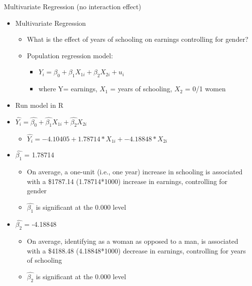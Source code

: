 \documentclass[8pt,ignorenonframetext,dvipsnames]{beamer}
\providecommand{\tightlist}{%
  \setlength{\itemsep}{0pt}\setlength{\parskip}{0pt}}
\let\olditem\item
\renewcommand{\item}{%
  \olditem\vspace{4pt}
}
\begin{document}
\begin{frame}{Multivariate Regression (no interaction effect)}
\protect\hypertarget{multivariate-regression-no-interaction-effect}{}

\begin{itemize}
\tightlist
\item
  Multivariate Regression

  \begin{itemize}
  \tightlist
  \item
    What is the effect of years of schooling on earnings controlling for
    gender?
  \item
    Population regression model:

    \begin{itemize}
    \tightlist
    \item
      \(Y_i = \beta_0 + \beta_1X_{1i} + \beta_2X_{2i} + u_i\)
    \item
      where Y= earnings, \(X_{1}\) = years of schooling, \(X_{2}\) = 0/1
      women
    \end{itemize}
  \end{itemize}
\item
  Run model in R
\item
  \(\hat{Y_i} = \hat{\beta_0} + \hat{\beta_1}X_{1i} + \hat{\beta_2}X_{2i}\)

  \begin{itemize}
  \tightlist
  \item
    \(\hat{Y_i} = -4.10405 + 1.78714*X_{1i} + -4.18848*X_{2i}\)
  \end{itemize}
\item
  \(\hat{\beta_1}\) = 1.78714

  \begin{itemize}
  \tightlist
  \item
    On average, a one-unit (i.e., one year) increase in schooling is
    associated with a \$1787.14 (1.78714*1000) increase in earnings,
    controlling for gender
  \item
    \(\hat{\beta_1}\) is significant at the 0.000 level
  \end{itemize}
\item
  \(\hat{\beta_2}\) = -4.18848

  \begin{itemize}
  \tightlist
  \item
    On average, identifying as a woman as opposed to a man, is
    associated with a \$4188.48 (4.18848*1000) decrease in earnings,
    controlling for years of schooling
  \item
    \(\hat{\beta_2}\) is significant at the 0.000 level
  \end{itemize}
\end{itemize}

\end{frame}
\end{document}
